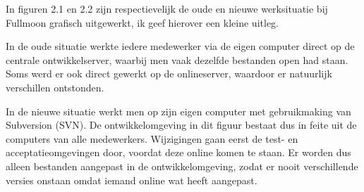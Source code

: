 In figuren 2.1 en 2.2 zijn respectievelijk de oude en nieuwe werksituatie bij Fullmoon grafisch uitgewerkt, ik geef hierover een kleine uitleg.

In de oude situatie werkte iedere medewerker via de eigen computer direct op de centrale ontwikkelserver, waarbij men vaak dezelfde bestanden open had staan. Soms werd er ook direct gewerkt op de onlineserver, waardoor er natuurlijk verschillen ontstonden.

In de nieuwe situatie werkt men op zijn eigen computer met gebruikmaking van Subversion (SVN). De ontwikkelomgeving in dit figuur bestaat dus in feite uit de computers van alle medewerkers. Wijzigingen gaan eerst de test- en acceptatieomgevingen door, voordat deze online komen te staan. Er worden dus alleen bestanden aangepast in de ontwikkelomgeving, zodat er nooit verschillende versies onstaan omdat iemand online wat heeft aangepast.